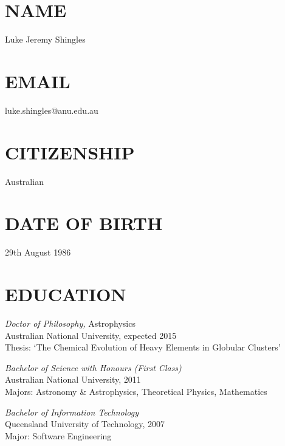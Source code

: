 \documentclass[line,margin]{res}
\begin{document}
\address{RSAA, Mount Stromlo Observatory, Cotter Road}
\address{Weston ACT 2611, Australia}

 
\begin{resume}

\section{NAME} Luke Jeremy Shingles

\section{EMAIL} luke.shingles@anu.edu.au
 
\section{CITIZENSHIP} Australian

\section{DATE OF BIRTH} 29th August 1986

\section{EDUCATION} {\sl Doctor of Philosophy,} Astrophysics \\
                Australian National University, expected 2015 \\
                Thesis: `The Chemical Evolution of Heavy Elements in Globular Clusters'

		{\sl Bachelor of Science with Honours (First Class)} \\
                Australian National University, 2011 \\
                Majors: Astronomy \& Astrophysics, Theoretical Physics, Mathematics
 
		{\sl Bachelor of Information Technology} \\
                Queensland University of Technology, 2007 \\
                Major: Software Engineering

\end{resume}
\end{document}
